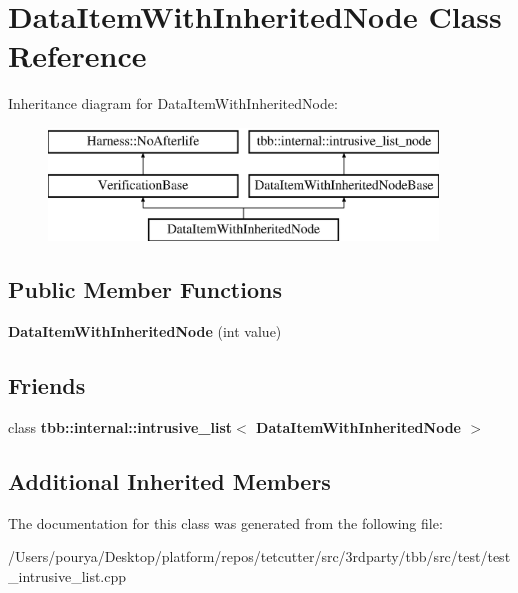 \hypertarget{classDataItemWithInheritedNode}{}\section{Data\+Item\+With\+Inherited\+Node Class Reference}
\label{classDataItemWithInheritedNode}
Inheritance diagram for Data\+Item\+With\+Inherited\+Node\+:\begin{figure}[H]
\begin{center}
\leavevmode
\includegraphics[height=3.000000cm]{classDataItemWithInheritedNode}
\end{center}
\end{figure}
\subsection*{Public Member Functions}
\begin{DoxyCompactItemize}
\item 
\hypertarget{classDataItemWithInheritedNode_aab011b4658a71bd821c003c916a2d312}{}{\bfseries Data\+Item\+With\+Inherited\+Node} (int value)\label{classDataItemWithInheritedNode_aab011b4658a71bd821c003c916a2d312}

\end{DoxyCompactItemize}
\subsection*{Friends}
\begin{DoxyCompactItemize}
\item 
\hypertarget{classDataItemWithInheritedNode_ae70a2eccaf602e5c099b364a224ced7e}{}class {\bfseries tbb\+::internal\+::intrusive\+\_\+list$<$ Data\+Item\+With\+Inherited\+Node $>$}\label{classDataItemWithInheritedNode_ae70a2eccaf602e5c099b364a224ced7e}

\end{DoxyCompactItemize}
\subsection*{Additional Inherited Members}


The documentation for this class was generated from the following file\+:\begin{DoxyCompactItemize}
\item 
/\+Users/pourya/\+Desktop/platform/repos/tetcutter/src/3rdparty/tbb/src/test/test\+\_\+intrusive\+\_\+list.\+cpp\end{DoxyCompactItemize}
